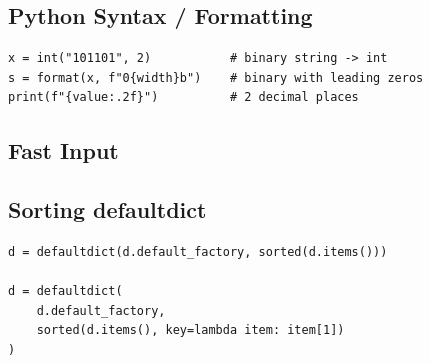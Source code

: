 \subsection{Python Syntax / Formatting}
\begin{lstlisting}
x = int("101101", 2)           # binary string -> int
s = format(x, f"0{width}b")    # binary with leading zeros
print(f"{value:.2f}")          # 2 decimal places
\end{lstlisting}

\subsection{Fast Input}


\subsection{Sorting defaultdict}
\begin{lstlisting}
d = defaultdict(d.default_factory, sorted(d.items()))

d = defaultdict(
    d.default_factory,
    sorted(d.items(), key=lambda item: item[1])
)
\end{lstlisting}
